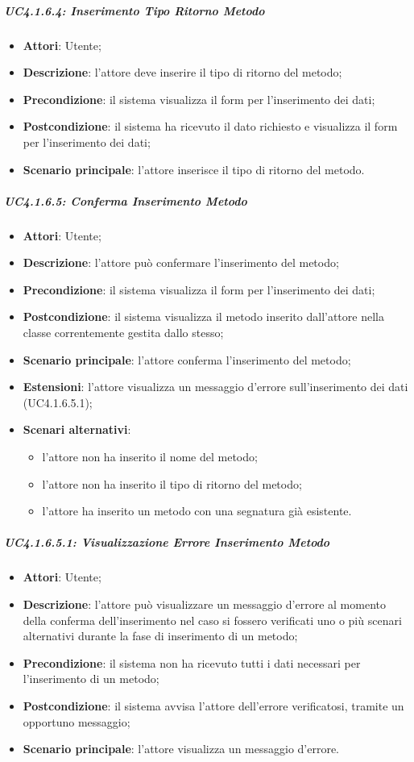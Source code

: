\subparagraph{UC4.1.6.4: Inserimento Tipo Ritorno Metodo}
\label{UC4.1.6.4}
\begin{itemize}
	\item \textbf{Attori}: Utente;
	\item \textbf{Descrizione}: l'attore deve inserire il tipo di ritorno del metodo;
	\item \textbf{Precondizione}: il sistema visualizza il form per l'inserimento dei dati;
	\item \textbf{Postcondizione}: il sistema ha ricevuto il dato richiesto e visualizza il form per l'inserimento dei dati;
	\item \textbf{Scenario principale}: l'attore inserisce il tipo di ritorno del metodo.
\end{itemize}

\subparagraph{UC4.1.6.5: Conferma Inserimento Metodo}
\label{UC4.1.6.5}
\begin{itemize}
	\item \textbf{Attori}: Utente;
	\item \textbf{Descrizione}: l'attore può confermare l'inserimento del metodo;
	\item \textbf{Precondizione}: il sistema visualizza il form per l'inserimento dei dati;
	\item \textbf{Postcondizione}: il sistema visualizza il metodo inserito dall'attore nella classe correntemente gestita dallo stesso;
	\item \textbf{Scenario principale}: l'attore conferma l'inserimento del metodo;
	\item \textbf{Estensioni}: l'attore visualizza un messaggio d'errore sull'inserimento dei dati (UC4.1.6.5.1);
	\item \textbf{Scenari alternativi}:
	\begin{itemize}
		\item l'attore non ha inserito il nome del metodo;
		\item l'attore non ha inserito il tipo di ritorno del metodo;
		\item l'attore ha inserito un metodo con una segnatura già esistente.
	\end{itemize}
\end{itemize}

\subparagraph{UC4.1.6.5.1: Visualizzazione Errore Inserimento Metodo}
\label{UC4.1.6.5.1}
\begin{itemize}
	\item \textbf{Attori}: Utente;
	\item \textbf{Descrizione}: l'attore può visualizzare un messaggio d'errore al momento della conferma dell'inserimento nel caso si fossero verificati uno o più scenari alternativi durante la fase di inserimento di un metodo;
	\item \textbf{Precondizione}: il sistema non ha ricevuto tutti i dati necessari per l'inserimento di un metodo;
	\item \textbf{Postcondizione}: il sistema avvisa l'attore dell'errore verificatosi, tramite un opportuno messaggio;
	\item \textbf{Scenario principale}: l'attore visualizza un messaggio d'errore.
\end{itemize}

